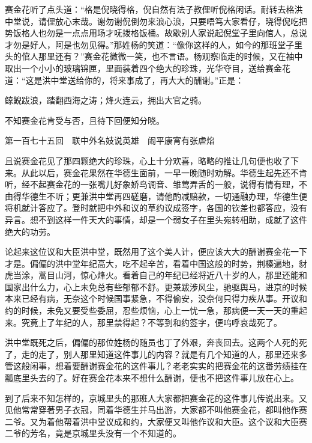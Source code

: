 \documentclass[12pt,UTF8]{ctexbook}
\begin{document}
{{{赛金花听了点头道：“格是倪晓得格，倪自然有法子教俚听倪格闲话。耐转去格洪中堂说，请俚放心末哉。谢勿谢倪倒勿来浪心浪，只要唔笃大家看仔，晓得倪吃把势饭格人也勿是一点点用场才呒拨格饭桶。故歇别人家说起倪堂子里向倌人，总说才勿是好人，阿是也勿见得。”那姓杨的笑道：“像你这样的人，如今的那班堂子里头的倌人那里还有？”赛金花微微一笑，也不言语。杨观察临走的时候，又在袖中取出一个小小的玻璃锦匣，里面装着四个绝大的珍珠，光华夺目，送给赛金花道：“这是洪中堂送给你的，将来事成了，再大大的酬谢。”正是：

鲸鲵跋浪，踏翻西海之涛；烽火连云，拥出大官之骑。

不知赛金花肯受与否，且待下回便知分晓。





第一百七十五回　联中外名妓说英雄　闹平康宵有张虐焰





且说赛金花见了那四颗绝大的珍珠，心上十分欢喜，略略的推让几句便也收了下来。从此以后，赛金花果然在华德生面前，一早一晚随时劝解。华德生起先还不肯听，经不起赛金花的一张嘴儿好象娇鸟调音、雏莺弄舌的一般，说得有情有理，不由得华德生不听；更兼洪中堂再四磋磨，请他酌减赔款，一切通融办理，华德生便将机就计答应了。登时就把中外和议的草约议成签字，各国的钦差也都答应，没有异言。想不到这样一件天大的事情，却是一个弱女子在里头宛转相助，成就了这件绝大的功劳。

论起来这位议和大臣洪中堂，既然用了这个美人计，便应该大大的酬谢赛金花一下才是。偏偏的洪中堂年纪高大，吃不起辛苦，看着中国这般的时势，荆榛遍地，豺虎当涂，蒿目山河，惊心烽火。看着自己的年纪已经将近八十岁的人，那里还能和国家出什么力，心上未免总有些郁郁不舒。更兼跋涉风尘，驰驱舆马，进京的时候本来已经有病，无奈这个时候国事紧急，不得偷安，没奈何只得力疾从事。开议和约的时候，未免又要受些委屈，忍些烦恼，心上一忧一急，那病便一天一天的重起来。究竟上了年纪的人，那里禁得起？不等到和约签字，便呜呼哀哉死了。

洪中堂既死之后，偏偏的那位姓杨的随员也丁了外艰，奔丧回去。这两个人死的死了，走的走了，别人那里知道这件事儿的内容？就是有几个知道的人，那里还来多管这般闲事，想着要酬谢赛金花的这件事儿？老老实实的把赛金花的这番劳绩挂在瓢底里头去的了。好在赛金花本来不想什么酬谢，便也不把这件事儿放在心上。

到了后来不知怎样的，京城里头的那班人大家都把赛金花的这件事儿传说出来。又见他常常穿著男子衣冠，同着华德生并马出游，大家都不叫他赛金花，都叫他作赛二爷。又为着他帮着洪中堂议成和约，大家便又叫他作议和大臣。这个议和大臣赛二爷的芳名，竟是京城里头没有一个不知道的。

}}}
\end{document}
